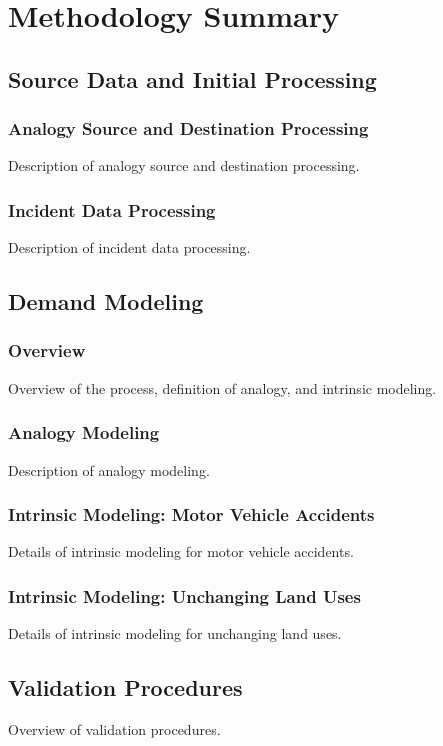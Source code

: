 \chapter{Methodology Summary}

\section{Source Data and Initial Processing}
\subsection{Analogy Source and Destination Processing}
Description of analogy source and destination processing.

\subsection{Incident Data Processing}
Description of incident data processing.

\section{Demand Modeling}
\subsection{Overview}
Overview of the process, definition of analogy, and intrinsic modeling.

\subsection{Analogy Modeling}
Description of analogy modeling.

\subsection{Intrinsic Modeling: Motor Vehicle Accidents}
Details of intrinsic modeling for motor vehicle accidents.

\subsection{Intrinsic Modeling: Unchanging Land Uses}
Details of intrinsic modeling for unchanging land uses.

\section{Validation Procedures}
Overview of validation procedures.
